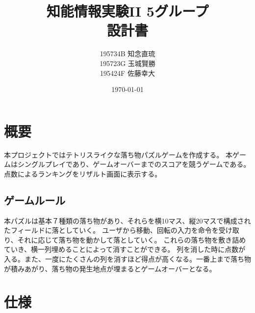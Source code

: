 \documentclass[a4paper,11pt]{jsarticle}
\begin{document}
\title{知能情報実験II 5グループ\\設計書}
\author{195734B 知念直琉\\195723G 玉城賢勝\\195424F 佐藤幸大}
\date{\today}
\maketitle
\section{概要}
本プロジェクトではテトリスライクな落ち物パズルゲームを作成する。
本ゲームはシングルプレイであり、ゲームオーバーまでのスコアを競うゲームである。
点数によるランキングをリザルト画面に表示する。
\subsection{ゲームルール}
本パズルは基本７種類の落ち物があり、それらを横10マス、縦20マスで構成されたフィールドに落としていく。
ユーザから移動、回転の入力を命令を受け取り、それに応じて落ち物を動かして落としていく。
これらの落ち物を敷き詰めていき、横一列埋めることによって消すことができる。
列を消した時に点数が入る。また、一度にたくさんの列を消すほど得点が高くなる。一番上まで落ち物が積みあがり、落ち物の発生地点が埋まるとゲームオーバーとなる。

\section{仕様}
\end{document}
